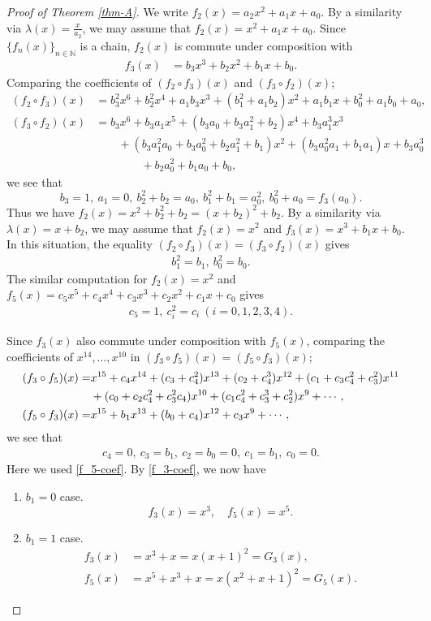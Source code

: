 \documentclass[a4paper, 11pt]{amsart}
\numberwithin{equation}{section}
\theoremstyle{definition}
\newcommand{\N}{\mathbb{N}}
\begin{document}
\begin{proof}[Proof of Theorem \ref{thm-A}]
We write $f_2(x)=a_2x^2+a_1x+a_0$.
By a similarity via $\lambda(x)=\frac{x}{a_2}$, we may assume that $f_2(x)=x^2+a_1x+a_0$.
Since $\{f_n(x)\}_{n\in \N}$ is a chain, $f_2(x)$ is commute under composition with
\begin{align*}
f_3(x)&=b_3x^3+b_2x^2+b_1x+b_0.
\end{align*}
Comparing the coefficients of $(f_2\circ f_3)(x)$ and $(f_3\circ f_2)(x)$;
\begin{align*}
(f_2\circ f_3)(x)&=b_3^2x^6+b_2^2x^4+a_1b_3x^3+(b_1^2+a_1b_2)x^2+a_1b_1x+b_0^2+a_1b_0+a_0,\\
(f_3\circ f_2)(x)&=b_3x^6+b_3a_1x^5+(b_3a_0+b_3a_1^2+b_2)x^4+b_3a_1^3x^3\\
&\qquad +(b_3a_1^2a_0+b_3a_0^2+b_2a_1^2+b_1)x^2+(b_3a_0^2a_1+b_1a_1)x+b_3a_0^3\\
&\qquad \qquad  +b_2a_0^2+b_1a_0+b_0,
\end{align*}
we see that 
\[
b_3=1,\ a_1=0,\ b_2^2+b_2=a_0,\ b_1^2+b_1=a_0^2,\ b_0^2+a_0=f_3(a_0).
\]
Thus we have $f_2(x)=x^2+b_2^2+b_2=(x+b_2)^2+b_2$.
By a similarity via $\lambda(x)=x+b_2$, we may assume that $f_2(x)=x^2$ and $f_3(x)=x^3+b_1x+b_0$.
In this situation, the equality $(f_2\circ f_3)(x)=(f_3\circ f_2)(x)$ gives
\begin{align}\label{f_3-coef}
b_1^2=b_1,\ b_0^2=b_0.
\end{align}
The similar computation for $f_2(x)=x^2$ and $f_5(x)=c_5x^5+c_4x^4+c_3x^3+c_2x^2+c_1x+c_0$ gives
\begin{align}\label{f_5-coef}
c_5=1,\ c_i^2=c_i\ (i=0,1,2,3,4).
\end{align}

Since $f_3(x)$ also commute under composition with $f_5(x)$, comparing the coefficients of $x^{14}, 
\dots, x^{10}$ in $(f_3\circ f_5)(x)=(f_5\circ f_3)(x)$;
\begin{align}\label{f_3-f_5}
(f_3\circ f_5)(x)
=&x^{15}
+c_4x^{14}
+(c_3+c_4^2)x^{13}
+(c_2+c_4^3)x^{12}
+(c_1+c_3c_4^2+c_3^2)x^{11}\\\notag
&+(c_0+c_2c_4^2+c_3^2c_4)x^{10}
+(c_1c_4^2+c_3^3+c_2^2)x^9%
+\cdots ,\\\notag
(f_5\circ f_3)(x)
=&x^{15}
+b_1x^{13}
+(b_0+c_4)x^{12}
+c_3x^9+\cdots ,
\end{align}
we see that
\begin{align}\label{b-c}
c_4=0,\ c_3=b_1,\ c_2=b_0=0,\ c_1=b_1,\ c_0=0.
\end{align}
Here we used \eqref{f_5-coef}.
By \eqref{f_3-coef}, we now have
\begin{enumerate}
\item 
$b_1=0$ case.
\[
f_3(x)=x^3,\quad f_5(x)=x^5.
\]
\item
$b_1=1$ case.
\begin{align*}
    f_3(x)&=x^3+x=x(x+1)^2=G_3(x),\\ f_5(x)&=x^5+x^3+x=x(x^2+x+1)^2=G_5(x).
\end{align*}


\end{enumerate}
\end{proof}
\end{document}
